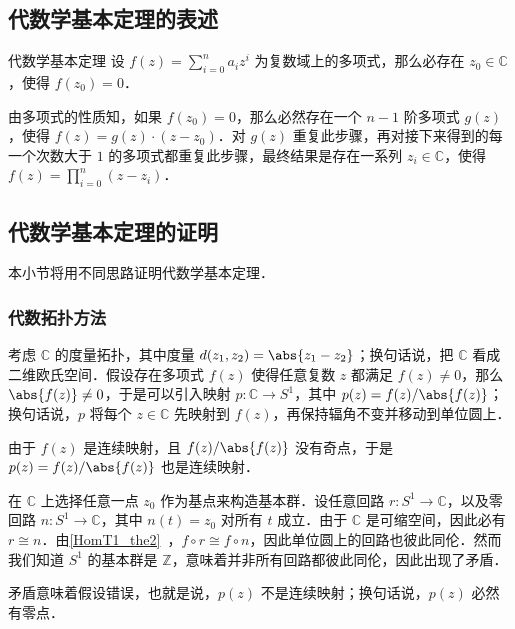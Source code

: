 
\begin{issues}
\issueTODO
\end{issues}


\subsection{代数学基本定理的表述}

\begin{definition}{代数学基本定理}
设 $f(z)=\sum\limits_{i=0}^n a_iz^i$ 为复数域上的多项式，那么必存在 $z_0\in\mathbb{C}$，使得 $f(z_0)=0$．
\end{definition}

由多项式的性质知，如果 $f(z_0)=0$，那么必然存在一个 $n-1$ 阶多项式 $g(z)$，使得 $f(z)=g(z)\cdot(z-z_0)$．对 $g(z)$ 重复此步骤，再对接下来得到的每一个次数大于 $1$ 的多项式都重复此步骤，最终结果是存在一系列 $z_i\in\mathbb{C}$，使得 $f(z)=\prod\limits_{i=0}^{n}(z-z_i)$．

\subsection{代数学基本定理的证明}

本小节将用不同思路证明代数学基本定理．

\subsubsection{代数拓扑方法}

考虑 $\mathbb{C}$ 的度量拓扑，其中度量 $d(z_1, z_2)=\abs{z_1-z_2}$；换句话说，把 $\mathbb{C}$ 看成二维欧氏空间．假设存在多项式 $f(z)$ 使得任意复数 $z$ 都满足 $f(z)\not=0$，那么 $\abs{f(z)}\not=0$，于是可以引入映射 $p:\mathbb{C}\rightarrow S^1$，其中 $p(z)=f(z)/\abs{f(z)}$；换句话说，$p$ 将每个 $z\in\mathbb{C}$ 先映射到 $f(z)$，再保持辐角不变并移动到单位圆上．

由于 $f(z)$ 是连续映射，且 $f(z)/\abs{f(z)}$ 没有奇点，于是 $p(z)=f(z)/\abs{f(z)}$ 也是连续映射．

在 $\mathbb{C}$ 上选择任意一点 $z_0$ 作为基点来构造基本群．设任意回路 $r:S^1\rightarrow\mathbb{C}$，以及零回路 $n:S^1\rightarrow\mathbb{C}$，其中 $n(t)=z_0$ 对所有 $t$ 成立．由于 $\mathbb{C}$ 是可缩空间，因此必有 $r\cong n$．由\autoref{HomT1_the2}~，$f\circ r\cong f\circ n$，因此单位圆上的回路也彼此同伦．然而我们知道 $S^1$ 的基本群是 $\mathbb{Z}$，意味着并非所有回路都彼此同伦，因此出现了矛盾．

矛盾意味着假设错误，也就是说，$p(z)$ 不是连续映射；换句话说，$p(z)$ 必然有零点．


